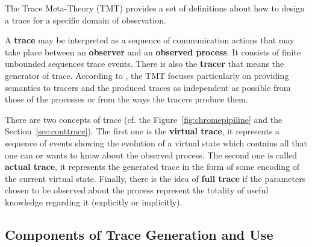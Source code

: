 \label{sec:TraceMetaTheory}

The Trace Meta-Theory (TMT) \cite{TMTmanuscript} provides a set of definitions about how to design a trace for a specific domain of observation.

A \textbf{trace} may be interpreted as a sequence of communication actions
that may take place between an \textbf{observer} and an
\textbf{observed process}. It consists of
finite unbounded sequences trace events. There
is also the \textbf{tracer} that means the generator of trace. According
to \cite{deransart2008trace}, the TMT focuses particularly on providing semantics to 
tracers and the produced traces as independent as
possible from those of the processes or from the ways the tracers produce them.

There are two concepts of trace \cite{deransart2008trace} (cf. the Figure~\ref{fig:chromepipiline} and the Section~\ref{sec:conttrace}). The first one is the \textbf{virtual trace}, it
represents a sequence of events showing the evolution of a virtual state which contains
all that one can or wants to know about the observed process. The second one
is called \textbf{actual trace}, it represents the generated trace in the form of some encoding of the current virtual state. Finally, there is the idea of \textbf{full trace} if the parameters chosen to be observed about the process
represent the totality of useful knowledge regarding it (explicitly or implicitly).


\subsection{Components of Trace Generation and Use}

